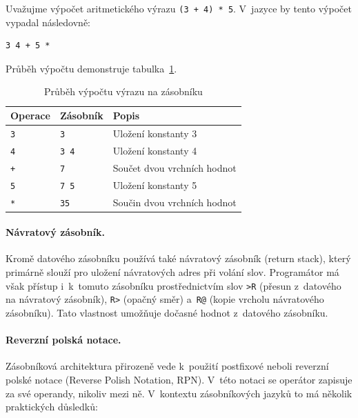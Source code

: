 Uvažujme výpočet aritmetického výrazu \texttt{(3 + 4) * 5}.
V~jazyce \Forth{} by tento výpočet vypadal následovně:

\begin{lstlisting}[basicstyle=\small\ttfamily]
3 4 + 5 *
\end{lstlisting}

Průběh výpočtu demonstruje tabulka~\ref{tab:stack-trace}.

\begin{table}[ht]
	\centering
	\caption{Průběh výpočtu výrazu na zásobníku}
	\label{tab:stack-trace}
	\begin{tabular}{lll}
		\toprule
		\textbf{Operace} & \textbf{Zásobník} & \textbf{Popis}              \\
		\midrule
		\texttt{3}       & \texttt{3}        & Uložení konstanty 3         \\
		\texttt{4}       & \texttt{3 4}      & Uložení konstanty 4         \\
		\texttt{+}       & \texttt{7}        & Součet dvou vrchních hodnot \\
		\texttt{5}       & \texttt{7 5}      & Uložení konstanty 5         \\
		\texttt{*}       & \texttt{35}       & Součin dvou vrchních hodnot \\
		\bottomrule
	\end{tabular}
\end{table}

\paragraph{Návratový zásobník.}
Kromě datového zásobníku používá \Forth{} také návratový zásobník
(return stack), který primárně slouží pro uložení návratových adres
při volání slov. Programátor má však přístup i~k~tomuto zásobníku
prostřednictvím slov \texttt{>R} (přesun z~datového na návratový zásobník),
\texttt{R>} (opačný směr) a~\texttt{R@} (kopie vrcholu návratového
zásobníku). Tato vlastnost umožňuje dočasné  hodnot
z~datového zásobníku.

\paragraph{Reverzní polská notace.}
Zásobníková architektura přirozeně vede k~použití postfixové neboli
reverzní polské notace (Reverse Polish Notation, RPN). V~této notaci
se operátor zapisuje za své operandy, nikoliv mezi ně. V~kontextu
zásobníkových jazyků to má několik praktických důsledků:

